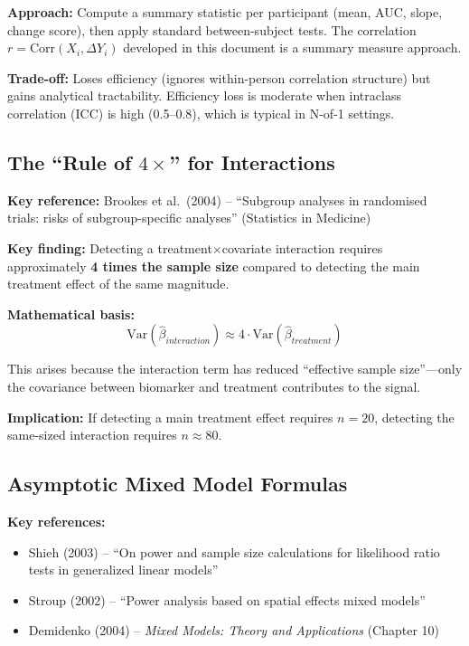 \documentclass[11pt]{article}
\theoremstyle{definition}
\begin{document}
\textbf{Approach:} Compute a summary statistic per participant (mean, AUC,
slope, change score), then apply standard between-subject tests. The correlation
$r = \text{Corr}(X_i, \Delta Y_i)$ developed in this document is a summary
measure approach.

\textbf{Trade-off:} Loses efficiency (ignores within-person correlation structure)
but gains analytical tractability. Efficiency loss is moderate when intraclass
correlation (ICC) is high (0.5--0.8), which is typical in N-of-1 settings.

\subsection{The ``Rule of $4\times$'' for Interactions}

\textbf{Key reference:} Brookes et al.\ (2004) -- ``Subgroup analyses in
randomised trials: risks of subgroup-specific analyses'' (Statistics in Medicine)

\textbf{Key finding:} Detecting a treatment$\times$covariate interaction requires
approximately \textbf{4 times the sample size} compared to detecting the main
treatment effect of the same magnitude.

\textbf{Mathematical basis:}
\begin{equation}
\text{Var}(\hat{\beta}_{interaction}) \approx 4 \cdot \text{Var}(\hat{\beta}_{treatment})
\end{equation}

This arises because the interaction term has reduced ``effective sample size''---only
the covariance between biomarker and treatment contributes to the signal.

\textbf{Implication:} If detecting a main treatment effect requires $n = 20$,
detecting the same-sized interaction requires $n \approx 80$.

\subsection{Asymptotic Mixed Model Formulas}

\textbf{Key references:}
\begin{itemize}
    \item Shieh (2003) -- ``On power and sample size calculations for likelihood
    ratio tests in generalized linear models''
    \item Stroup (2002) -- ``Power analysis based on spatial effects mixed models''
    \item Demidenko (2004) -- \textit{Mixed Models: Theory and Applications} (Chapter 10)
\end{itemize}
\end{document}
